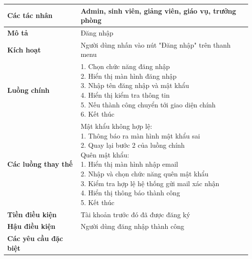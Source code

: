   \begin{tabular}{|l|l|}
    \hline
    \textbf{Các tác nhân} & Admin, sinh viên, giảng viên, giáo vụ, trưởng phòng \\
    \hline
    \textbf{Mô tả} & Đăng nhập\\
    \hline
    \textbf{Kích hoạt} & Người dùng nhấn vào nút "Đăng nhập" trên thanh menu \\
    \hline
    \textbf{Luồng chính} & \makecell[l]{1. Chọn chức năng đăng nhập \\ 2. Hiển thị màn hình đăng nhập \\ 3. Nhập tên đăng nhập và mật khẩu \\ 4. Hiển thị kiểm tra thông tin \\ 5. Nếu thành công chuyển tới giao diện chính \\ 6. Kết thúc} \\
    \hline
    \textbf{Các luồng thay thế} & \makecell[l]{Mật khẩu không hợp lệ: \\ 1. Thông báo ra màn hình mật khẩu sai \\ 2. Quay lại bước 2 của luồng chính \\ Quên mật khẩu: \\ 1. Hiển thị màn hình nhập email \\ 2. Nhập và chọn chức năng quên mật khẩu \\ 3. Kiểm tra hợp lệ hệ thống gửi mail xác nhận \\ 4. Hiển thị thông báo thành công \\ 5. Kết thúc} \\
    \hline
    \textbf{Tiền điều kiện} & Tài khoản trước đó đã được đăng ký \\
    \hline
    \textbf{Hậu điều kiện} & Người dùng đăng nhập thành công \\
    \hline
    \textbf{Các yêu cầu đặc biệt} & \\
    \hline
  \end{tabular}

